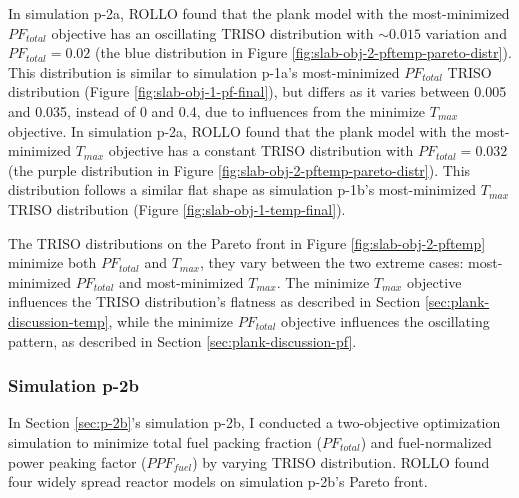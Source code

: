 In simulation p-2a, \gls{ROLLO} found that the plank model with the 
most-minimized $PF_{total}$ objective has an oscillating TRISO distribution with 
$\sim0.015$ variation and $PF_{total}=0.02$
(the blue distribution in Figure \ref{fig:slab-obj-2-pftemp-pareto-distr}). 
This distribution is similar to simulation p-1a's most-minimized $PF_{total}$ TRISO 
distribution (Figure \ref{fig:slab-obj-1-pf-final}), but differs as it varies between 
0.005 and 0.035, instead of 0 and 0.4, due to influences from the minimize $T_{max}$ 
objective.
In simulation p-2a, \gls{ROLLO} found that the plank model with the most-minimized 
$T_{max}$ objective has a constant TRISO distribution with $PF_{total} = 0.032$
(the purple distribution in Figure \ref{fig:slab-obj-2-pftemp-pareto-distr}).
This distribution follows a similar flat shape as simulation p-1b's most-minimized 
$T_{max}$ TRISO distribution (Figure \ref{fig:slab-obj-1-temp-final}).

The \gls{TRISO} distributions on the Pareto front in Figure \ref{fig:slab-obj-2-pftemp} 
minimize both $PF_{total}$ and $T_{max}$, they vary between the two extreme cases: 
most-minimized $PF_{total}$ and most-minimized $T_{max}$. 
The minimize $T_{max}$ objective influences the TRISO distribution's flatness as 
described in Section \ref{sec:plank-discussion-temp}, while 
the minimize $PF_{total}$ objective influences the oscillating pattern, as described 
in Section \ref{sec:plank-discussion-pf}.

\subsubsection{Simulation p-2b}
In Section \ref{sec:p-2b}'s simulation p-2b, I conducted a two-objective 
optimization simulation to minimize total fuel packing fraction ($PF_{total}$) and 
fuel-normalized power peaking factor ($PPF_{fuel}$) by varying TRISO distribution. 
\gls{ROLLO} found four widely spread reactor models on simulation p-2b's Pareto 
front. 

